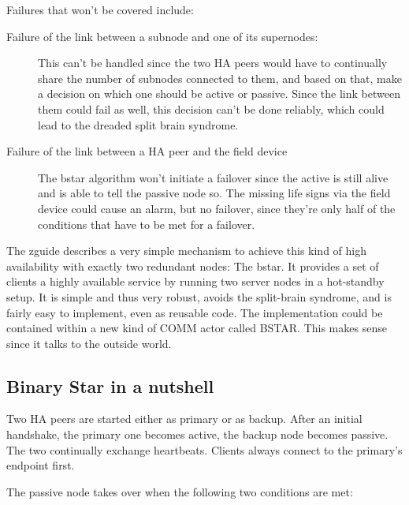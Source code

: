 Failures that won't be covered include:
\begin{description}
	\item [Failure of the link between a subnode and one of its supernodes:]

		This can't be handled since the two HA peers would have to
		continually share the number of subnodes connected to them, and
		based on that, make a decision on which one should be active or
		passive. Since the link between them could fail as well, this
		decision can't be done reliably, which could lead to the
		dreaded split brain syndrome.


	\item [Failure of the link between a HA peer and the field device]
		The \gls{bstar} algorithm won't initiate a failover since the
		active is still alive and is able to tell the passive node so.
		The missing life signs via the field device could cause an alarm, but no
		failover, since they're only half of the conditions that have
		to be met for a failover.
\end{description}

The \gls{zguide} describes a very simple mechanism to achieve this kind of high
availability with exactly two redundant nodes: The \gls{bstar}. It
provides a set of clients a highly available service by running two server
nodes in a hot-standby setup. It is simple and thus very robust, avoids the
split-brain syndrome, and is fairly easy to implement, even as reusable
code. The implementation could be contained within a new kind of COMM actor
called BSTAR. This makes sense since it talks to the outside world.


\subsection{Binary Star in a nutshell}
Two HA peers are started either as primary or as backup. After an initial
handshake, the primary one becomes active, the backup node becomes passive. The
two continually exchange heartbeats. Clients always connect to the primary's endpoint first.

The passive node takes over when the following two conditions are met:

